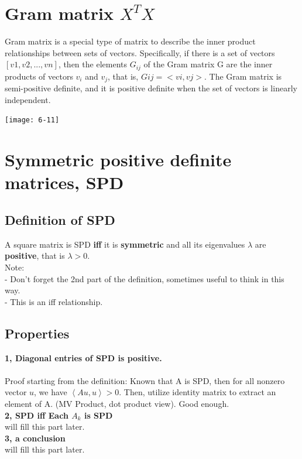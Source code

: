 \documentclass{article}
\begin{document}
\pagebreak
\section{Gram matrix $X^TX$}
Gram matrix is a special type of matrix
to describe the inner product relationships between sets of vectors. 
Specifically, if there is a set of vectors $[v1, v2, ..., vn]$, then the elements 
$G_{ij}$ of the Gram matrix G are the inner products of vectors $v_i$ and $v_j$, 
that is, $Gij = <vi, vj>$. The Gram matrix is semi-positive definite, and it is positive definite when the set of vectors is linearly independent.

\texttt{[image: 6-11]}\\

\pagebreak
\section{Symmetric positive definite matrices, SPD}
\subsection{Definition of SPD}
A square matrix is SPD \textbf{iff}
it is \textbf{symmetric} and all its eigenvalues $\lambda$ are \textbf{positive},
that is $\lambda > 0$.\\
Note: \\
- Don't forget the 2nd part of the definition, sometimes useful to think in this way.\\
- This is an iff relationship.

\subsection*{Properties}
\textbf{1, Diagonal entries of SPD is positive.}\\
\\
Proof starting from the definition: Known that A is SPD, then
for all nonzero vector $u$, we have $\left\langle Au,u\right\rangle > 0$.
\noindent
Then, utilize identity matrix to extract an element of A. (MV Product, dot product view). Good enough.\\

\noindent
\textbf{2, SPD iff Each $A_k$ is SPD}\\
will fill this part later.\\

\noindent
\textbf{3, a conclusion}\\
will fill this part later.\\
\end{document}
